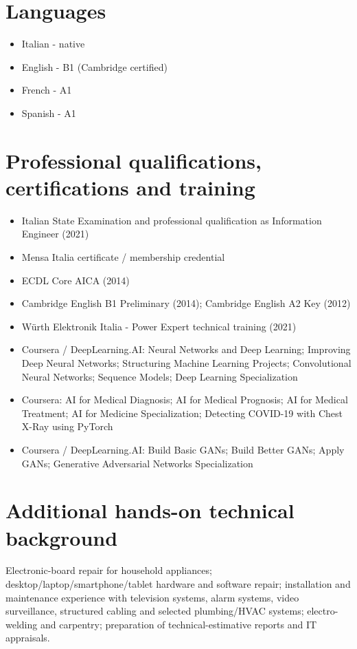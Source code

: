 \documentclass[10pt,a4paper]{article}
\begin{document}
\section{Languages}
\begin{itemize}
\item Italian - native
\item English - B1 (Cambridge certified)
\item French - A1
\item Spanish - A1
\end{itemize}

\section{Professional qualifications, certifications and training}
\begin{itemize}
\item Italian State Examination and professional qualification as Information Engineer (2021)
\item Mensa Italia certificate / membership credential
\item ECDL Core AICA (2014)
\item Cambridge English B1 Preliminary (2014); Cambridge English A2 Key (2012)
\item Würth Elektronik Italia - Power Expert technical training (2021)
\item Coursera / DeepLearning.AI: Neural Networks and Deep Learning; Improving Deep Neural Networks; Structuring Machine Learning Projects; Convolutional Neural Networks; Sequence Models; Deep Learning Specialization
\item Coursera: AI for Medical Diagnosis; AI for Medical Prognosis; AI for Medical Treatment; AI for Medicine Specialization; Detecting COVID-19 with Chest X-Ray using PyTorch
\item Coursera / DeepLearning.AI: Build Basic GANs; Build Better GANs; Apply GANs; Generative Adversarial Networks Specialization
\end{itemize}

\section{Additional hands-on technical background}
\color{BodyGrey}
Electronic-board repair for household appliances; desktop/laptop/smartphone/tablet hardware and software repair; installation and maintenance experience with television systems, alarm systems, video surveillance, structured cabling and selected plumbing/HVAC systems; electro-welding and carpentry; preparation of technical-estimative reports and IT appraisals.
\color{black}
\end{document}
